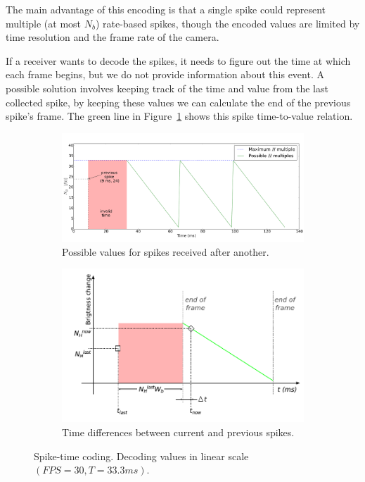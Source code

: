 \documentclass[conference]{IEEEtran}
\begin{document}
The main advantage of this encoding is that a single spike could represent multiple (at most $N_{b}$) rate-based spikes, though the encoded values are limited by time resolution and the frame rate of the camera.

If a receiver wants to decode the spikes, it needs to figure out the time at which each frame begins, but we do not provide information about this event. A possible solution involves keeping track of the time and value from the last collected spike, by keeping these values we can calculate the end of the previous spike's frame. The green line in Figure~\ref{fig:linear_time_all} shows this spike time-to-value relation. 

\begin{figure}[htb]
  
  \centering
  
  \begin{subfigure}[b]{0.45\textwidth}
    \includegraphics[width=\textwidth]{spike_values_linear}
    \caption{Possible values for spikes received after another.}
    \label{fig:linear_time_all}
  \end{subfigure}
  
  \begin{subfigure}[b]{0.45\textwidth}
    \includegraphics[width=\textwidth]{new_val_calc_linear}
    \caption{Time differences between current and previous spikes.}
    \label{fig:linear_time_calc}
  \end{subfigure}
  \caption{Spike-time coding. Decoding values in linear scale $(FPS=30,T=33.3ms)$.}
  \label{fig:linear_time}
\end{figure} 
\end{document}
